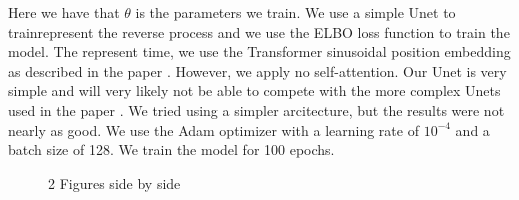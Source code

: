 Here we have that $\theta$ is the parameters we train. We use a simple Unet to trainrepresent the reverse process and we use the ELBO loss function to train the model. The represent time, we use the  Transformer sinusoidal position embedding as described in the paper \cite{diffusion}. However, we apply no self-attention. Our Unet is very simple and will very likely not be able to compete with the more complex Unets used in the paper \cite{diffusion}. We tried using a simpler arcitecture, but the results were not nearly as good. We use the Adam optimizer with a learning rate of $10^{-4}$ and a batch size of 128. We train the model for 100 epochs.

\begin{figure}[H]
    \centering
    \caption{2 Figures side by side}%
    \label{fig:example}%
\end{figure}

